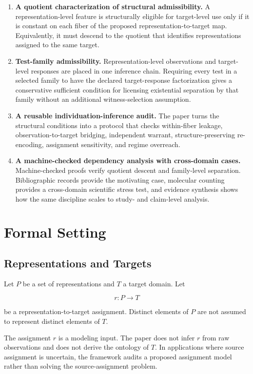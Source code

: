 \documentclass[12pt]{article}
\begin{document}
\begin{enumerate}[leftmargin=*]
\item \textbf{A quotient characterization of structural admissibility.} A representation-level feature is structurally eligible for target-level use only if it is constant on each fiber of the proposed representation-to-target map. Equivalently, it must descend to the quotient that identifies representations assigned to the same target.
\item \textbf{Test-family admissibility.} Representation-level observations and target-level responses are placed in one inference chain. Requiring every test in a selected family to have the declared target-response factorization gives a conservative sufficient condition for licensing existential separation by that family without an additional witness-selection assumption.
\item \textbf{A reusable individuation-inference audit.} The paper turns the structural conditions into a protocol that checks within-fiber leakage, observation-to-target bridging, independent warrant, structure-preserving re-encoding, assignment sensitivity, and regime overreach.
\item \textbf{A machine-checked dependency analysis with cross-domain cases.} Machine-checked proofs verify quotient descent and family-level separation. Bibliographic records provide the motivating case, molecular counting provides a cross-domain scientific stress test, and evidence synthesis shows how the same discipline scales to study- and claim-level analysis.
\end{enumerate}

\section{Formal Setting}

\subsection{Representations and Targets}

Let \(P\) be a set of representations and \(T\) a target domain. Let

\[
r:P\to T
\]

be a representation-to-target assignment. Distinct elements of \(P\) are not assumed to represent distinct elements of \(T\).

The assignment \(r\) is a modeling input. The paper does not infer \(r\) from raw observations and does not derive the ontology of \(T\). In applications where source assignment is uncertain, the framework audits a proposed assignment model rather than solving the source-assignment problem.
\end{document}
